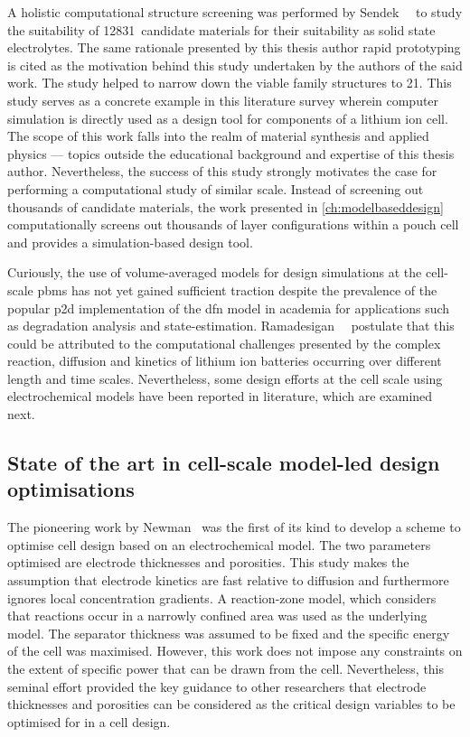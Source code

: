 A    holistic   computational    structure    screening    was   performed    by
Sendek~\etal~\cite{Sendek2017}  to  study  the  suitability  of  12831~candidate
materials for their suitability as  solid state electrolytes. The same rationale
presented  by  this thesis  author  \ie{}  rapid  prototyping  is cited  as  the
motivation behind  this study undertaken  by the authors  of the said  work. The
study  helped to  narrow down  the viable  family structures  to 21.  This study
serves  as  a  concrete  example  in this  literature  survey  wherein  computer
simulation is  directly used as  a design tool for  components of a  lithium ion
cell. The  scope of  this work falls  into the realm  of material  synthesis and
applied  physics ---  topics outside  the educational  background and  expertise
of  this  thesis  author.  Nevertheless,  the success  of  this  study  strongly
motivates  the case  for  performing  a computational  study  of similar  scale.
Instead of  screening out thousands  of candidate materials, the  work presented
in  \cref{ch:modelbaseddesign} computationally  screens out  thousands of  layer
configurations within a pouch cell and provides a simulation-based design tool.

Curiously,  the use  of volume-averaged  models  for design  simulations at  the
cell-scale  \glspl{pbm}  has not  yet  gained  sufficient traction  despite  the
prevalence of  the popular  \gls{p2d} implementation of  the \gls{dfn}  model in
academia  for applications  such as  degradation analysis  and state-estimation.
Ramadesigan~\etal~\cite{Ramadesigan2012} postulate that this could be attributed
to the  computational challenges  presented by  the complex  reaction, diffusion
and  kinetics of  lithium  ion  batteries occurring  over  different length  and
time  scales.  Nevertheless,  some  design  efforts  at  the  cell  scale  using
electrochemical  models have  been reported  in literature,  which are  examined
next.

\subsection{State of the art in cell-scale model-led design optimisations}

The pioneering  work by Newman~\cite{Newman1995}  was the  first of its  kind to
develop a scheme to optimise cell  design based on an electrochemical model. The
two parameters  optimised are electrode  thicknesses and porosities.  This study
makes the assumption that electrode kinetics  are fast relative to diffusion and
furthermore ignores local concentration  gradients. A reaction-zone model, which
considers  that reactions  occur in  a narrowly  confined area  was used  as the
underlying  model. The  separator  thickness was  assumed to  be  fixed and  the
specific energy  of the cell was  maximised. However, this work  does not impose
any constraints on the extent of specific power that can be drawn from the cell.
Nevertheless, this seminal effort provided the key guidance to other researchers
that  electrode thicknesses  and porosities  can be  considered as  the critical
design variables to be optimised for in a cell design.

